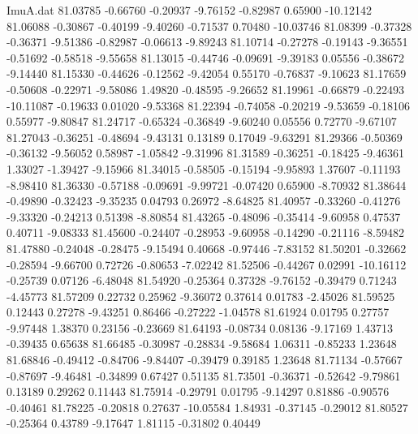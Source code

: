 \begin{filecontents}{ImuA.dat}
  81.03785   -0.66760   -0.20937   -9.76152   -0.82987    0.65900  -10.12142
  81.06088   -0.30867   -0.40199   -9.40260   -0.71537    0.70480  -10.03746
  81.08399   -0.37328   -0.36371   -9.51386   -0.82987   -0.06613   -9.89243
  81.10714   -0.27278   -0.19143   -9.36551   -0.51692   -0.58518   -9.55658
  81.13015   -0.44746   -0.09691   -9.39183    0.05556   -0.38672   -9.14440
  81.15330   -0.44626   -0.12562   -9.42054    0.55170   -0.76837   -9.10623
  81.17659   -0.50608   -0.22971   -9.58086    1.49820   -0.48595   -9.26652
  81.19961   -0.66879   -0.22493  -10.11087   -0.19633    0.01020   -9.53368
  81.22394   -0.74058   -0.20219   -9.53659   -0.18106    0.55977   -9.80847
  81.24717   -0.65324   -0.36849   -9.60240    0.05556    0.72770   -9.67107
  81.27043   -0.36251   -0.48694   -9.43131    0.13189    0.17049   -9.63291
  81.29366   -0.50369   -0.36132   -9.56052    0.58987   -1.05842   -9.31996
  81.31589   -0.36251   -0.18425   -9.46361    1.33027   -1.39427   -9.15966
  81.34015   -0.58505   -0.15194   -9.95893    1.37607   -0.11193   -8.98410
  81.36330   -0.57188   -0.09691   -9.99721   -0.07420    0.65900   -8.70932
  81.38644   -0.49890   -0.32423   -9.35235    0.04793    0.26972   -8.64825
  81.40957   -0.33260   -0.41276   -9.33320   -0.24213    0.51398   -8.80854
  81.43265   -0.48096   -0.35414   -9.60958    0.47537    0.40711   -9.08333
  81.45600   -0.24407   -0.28953   -9.60958   -0.14290   -0.21116   -8.59482
  81.47880   -0.24048   -0.28475   -9.15494    0.40668   -0.97446   -7.83152
  81.50201   -0.32662   -0.28594   -9.66700    0.72726   -0.80653   -7.02242
  81.52506   -0.44267    0.02991  -10.16112   -0.25739    0.07126   -6.48048
  81.54920   -0.25364    0.37328   -9.76152   -0.39479    0.71243   -4.45773
  81.57209    0.22732    0.25962   -9.36072    0.37614    0.01783   -2.45026
  81.59525    0.12443    0.27278   -9.43251    0.86466   -0.27222   -1.04578
  81.61924    0.01795    0.27757   -9.97448    1.38370    0.23156   -0.23669
  81.64193   -0.08734    0.08136   -9.17169    1.43713   -0.39435    0.65638
  81.66485   -0.30987   -0.28834   -9.58684    1.06311   -0.85233    1.23648
  81.68846   -0.49412   -0.84706   -9.84407   -0.39479    0.39185    1.23648
  81.71134   -0.57667   -0.87697   -9.46481   -0.34899    0.67427    0.51135
  81.73501   -0.36371   -0.52642   -9.79861    0.13189    0.29262    0.11443
  81.75914   -0.29791    0.01795   -9.14297    0.81886   -0.90576   -0.40461
  81.78225   -0.20818    0.27637  -10.05584    1.84931   -0.37145   -0.29012
  81.80527   -0.25364    0.43789   -9.17647    1.81115   -0.31802    0.40449

\end{filecontents}

